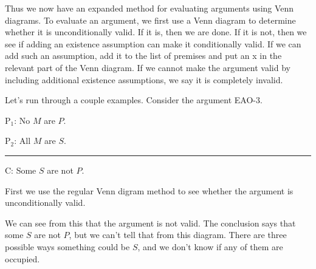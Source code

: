 Thus we now have an expanded method for evaluating arguments using Venn diagrams. To evaluate an argument, we first use a Venn diagram to determine whether it is unconditionally valid. If it is, then we are done. If it is not, then we see if adding an existence assumption can make it conditionally valid. If we can add such an assumption, add it to the list of premises and put an x in the relevant part of the Venn diagram. If we cannot make the argument valid by including additional existence assumptions, we say it is completely invalid.

Let's run through a couple examples. Consider the argument EAO-3.

\begin{earg}
\item[P$_1$:] No $M$ are $P$.
\item[P$_2$:] All $M$ are $S$.
\vspace{-.5em}
\item [] \rule{0.2\linewidth}{.5pt} 
\item[C:] Some $S$ are not $P$.   
\end{earg} 

First we use the regular Venn digram method to see whether the argument is unconditionally valid.

\begin{center}
\end{center}

We can see from this that the argument is not valid. The conclusion says that some $S$ are not $P$, but we can't tell that from this diagram. There are three possible ways something could be $S$, and we don't know if any of them are occupied. 

